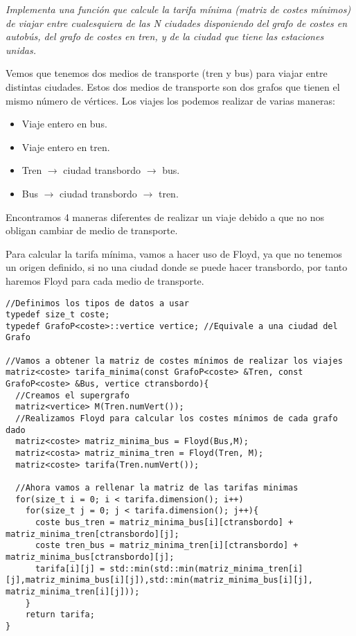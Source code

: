 \textit{Implementa una función que calcule la tarifa mínima (matriz de costes mínimos) de viajar entre cualesquiera de las N ciudades disponiendo del grafo de costes en autobús, del grafo de costes en tren, y de la ciudad que tiene las estaciones unidas.}

Vemos que tenemos dos medios de transporte (tren y bus) para viajar entre distintas ciudades. Estos dos medios de transporte son dos grafos que tienen el mismo número de vértices.
Los viajes los podemos realizar de varias maneras:
\begin{itemize}
  \item Viaje entero en bus.
  \item Viaje entero en tren.
  \item Tren \(\rightarrow\) ciudad transbordo \(\rightarrow\) bus.
  \item Bus \(\rightarrow\) ciudad transbordo \(\rightarrow\) tren.
\end{itemize}

Encontramos 4 maneras diferentes de realizar un viaje debido a que no nos obligan cambiar de medio de transporte.

Para calcular la tarifa mínima, vamos a hacer uso de Floyd, ya que no tenemos un origen definido, si no una ciudad donde se puede hacer transbordo, por tanto haremos Floyd para cada medio de transporte.

\begin{verbatim}
//Definimos los tipos de datos a usar
typedef size_t coste;
typedef GrafoP<coste>::vertice vertice; //Equivale a una ciudad del Grafo

//Vamos a obtener la matriz de costes mínimos de realizar los viajes
matriz<coste> tarifa_minima(const GrafoP<coste> &Tren, const GrafoP<coste> &Bus, vertice ctransbordo){
  //Creamos el supergrafo
  matriz<vertice> M(Tren.numVert());
  //Realizamos Floyd para calcular los costes mínimos de cada grafo dado
  matriz<coste> matriz_minima_bus = Floyd(Bus,M);
  matriz<costa> matriz_minima_tren = Floyd(Tren, M);
  matriz<coste> tarifa(Tren.numVert());

  //Ahora vamos a rellenar la matriz de las tarifas minimas
  for(size_t i = 0; i < tarifa.dimension(); i++)
    for(size_t j = 0; j < tarifa.dimension(); j++){
      coste bus_tren = matriz_minima_bus[i][ctransbordo] + matriz_minima_tren[ctransbordo][j];
      coste tren_bus = matriz_minima_tren[i][ctransbordo] + matriz_minima_bus[ctransbordo][j];
      tarifa[i][j] = std::min(std::min(matriz_minima_tren[i][j],matriz_minima_bus[i][j]),std::min(matriz_minima_bus[i][j], matriz_minima_tren[i][j]));
    }
    return tarifa;
}
\end{verbatim}

